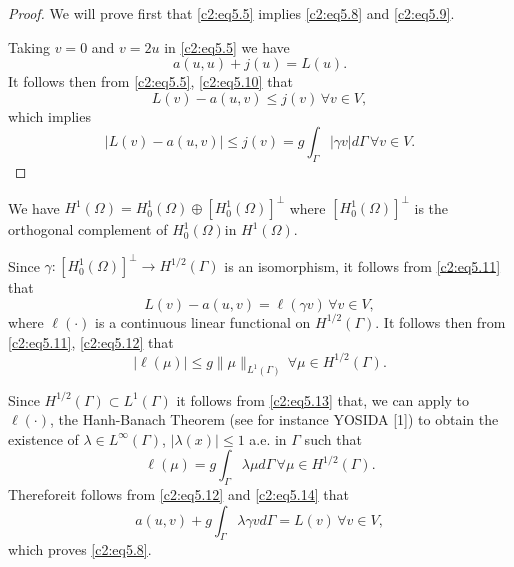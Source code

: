  \begin{proof}
We will prove first that \eqref{c2:eq5.5} implies  \eqref{c2:eq5.8} 
and \eqref{c2:eq5.9}. 

Taking $v=0$ and $v =2u$ in \eqref{c2:eq5.5} we have 
  \begin{equation}
a(u, u) + j (u) = L(u). \tag{5.10}\label{c2:eq5.10}
  \end{equation}  
It follows  then from \eqref{c2:eq5.5}, \eqref{c2:eq5.10} that  
$$
L(v) -a(u, v) \leq j(v)\, \forall  v \in V,
$$
which implies 
\begin{equation}
|L(v) -a(u, v) | \leq j(v) = g \int_\Gamma |\gamma v |d \Gamma\, \forall 
v \in V. \tag{5.11}\label{c2:eq5.11} 
\end{equation}  
 \end{proof} 
 
We have $H^1(\Omega) = H^1_0 (\Omega) \oplus [H^1_0 (\Omega)]^\perp$
where $[H^1_0 (\Omega)]^\perp$ is the orthogonal complement of $H^1_0
(\Omega)$in $H^1(\Omega)$. 
  
Since $\gamma : [H^1_0 (\Omega)]^\perp \to H^{1/2}(\Gamma)$ is an
isomorphism, it follows from \eqref{c2:eq5.11} that  
\begin{equation}
L(v) -a(u, v) = \ell (\gamma v)\, \forall  v \in V,
\tag{5.12}\label{c2:eq5.12}  
\end{equation}
where $\ell(\cdot)$  is a continuous linear functional on
$H^{1/2}(\Gamma)$. It follows then from \eqref{c2:eq5.11},
\eqref{c2:eq5.12} that   
\begin{equation}
|\ell (\mu) | \leq g \parallel \mu \parallel_{L^1(\Gamma)}\, \forall  \mu \in
H^{1/2} (\Gamma). \tag{5.13}\label{c2:eq5.13} 
\end{equation}

Since $H^{1/2}(\Gamma) \subset L^1 (\Gamma)$ it follows from
\eqref{c2:eq5.13} that, we can apply to $\ell(\cdot)$, the Hanh-Banach
Theorem (see for instance YOSIDA [1]) to obtain the existence of
$\lambda \in L^\infty (\Gamma)$, $| \lambda (x) | \leq 1$ a.e. in
$\Gamma$ such that  
\begin{equation}
\ell(\mu) = g \int_\Gamma \lambda \mu d \Gamma\, \forall  \mu \in
H^{1/2} (\Gamma). \tag{5.14}\label{c2:eq5.14} 
\end{equation}
Therefore\pageoriginale  it follows from \eqref{c2:eq5.12} and \eqref{c2:eq5.14} that 
$$
a(u, v) + g \int_\Gamma \lambda \gamma v d \Gamma = L (v)\, \forall  v
\in V , 
$$
which proves \eqref{c2:eq5.8}.
 
